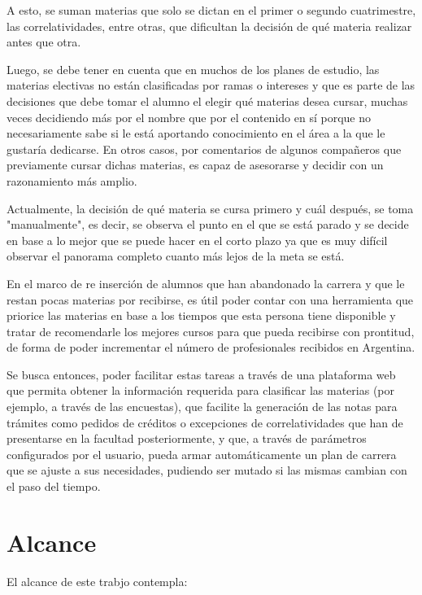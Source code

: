 \documentclass[a4paper]{article}
\begin{document}
A esto, se suman materias que solo se dictan en el primer o segundo cuatrimestre, las correlatividades, entre otras, que dificultan la decisión de qué materia realizar antes que otra.

Luego, se debe tener en cuenta que en muchos de los planes de estudio, las materias electivas no están clasificadas por ramas o intereses y que es parte de las decisiones que debe tomar el alumno el elegir qué materias desea cursar, muchas veces decidiendo más por el nombre que por el contenido en sí porque no necesariamente sabe si le está aportando conocimiento en el área a la que le gustaría dedicarse. En otros casos, por comentarios de algunos compañeros que previamente cursar dichas materias, es capaz de asesorarse y decidir con un razonamiento más amplio.

Actualmente, la decisión de qué materia se cursa primero y cuál después, se toma "manualmente", es decir, se observa el punto en el que se está parado y se decide en base a lo mejor que se puede hacer en el corto plazo ya que es muy difícil observar el panorama completo cuanto más lejos de la meta se está.

En el marco de re inserción de alumnos que han abandonado la carrera y que le restan pocas materias por recibirse, es útil poder contar con una herramienta que priorice las materias en base a los tiempos que esta persona tiene disponible y tratar de recomendarle los mejores cursos para que pueda recibirse con prontitud, de forma de poder incrementar el número de profesionales recibidos en Argentina.

Se busca entonces, poder facilitar estas tareas a través de una plataforma web que permita obtener la información requerida para clasificar las materias (por ejemplo, a través de las encuestas), que facilite la generación de las notas para trámites como pedidos de créditos o excepciones de correlatividades que han de presentarse en la facultad posteriormente, y que, a través de parámetros configurados por el usuario, pueda armar automáticamente un plan de carrera que se ajuste a sus necesidades, pudiendo ser mutado si las mismas cambian con el paso del tiempo.

\section{Alcance}

El alcance de este trabjo contempla:
\end{document}
